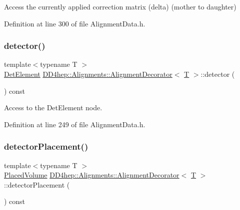 Access the currently applied correction matrix (delta) (mother to daughter) 



Definition at line 300 of file Alignment\+Data.\+h.

\hypertarget{class_d_d4hep_1_1_alignments_1_1_alignment_decorator_a4b987fb41e5abb24edc602be61050a06}{}\label{class_d_d4hep_1_1_alignments_1_1_alignment_decorator_a4b987fb41e5abb24edc602be61050a06} 
\subsubsection{\texorpdfstring{detector()}{detector()}}
{\footnotesize\ttfamily template$<$typename T $>$ \\
\hyperlink{class_d_d4hep_1_1_geometry_1_1_det_element}{Det\+Element} \hyperlink{class_d_d4hep_1_1_alignments_1_1_alignment_decorator}{D\+D4hep\+::\+Alignments\+::\+Alignment\+Decorator}$<$ \hyperlink{class_t}{T} $>$\+::detector (\begin{DoxyParamCaption}{ }\end{DoxyParamCaption}) const\hspace{0.3cm}{\ttfamily [inline]}}



Access to the Det\+Element node. 



Definition at line 249 of file Alignment\+Data.\+h.

\hypertarget{class_d_d4hep_1_1_alignments_1_1_alignment_decorator_a40ab3213777840bd21882ff07add2340}{}\label{class_d_d4hep_1_1_alignments_1_1_alignment_decorator_a40ab3213777840bd21882ff07add2340} 
\subsubsection{\texorpdfstring{detector\+Placement()}{detectorPlacement()}}
{\footnotesize\ttfamily template$<$typename T $>$ \\
\hyperlink{class_d_d4hep_1_1_alignments_1_1_alignment_decorator_a3dc9016a6686627ec2e6584aed9c8eeb}{Placed\+Volume} \hyperlink{class_d_d4hep_1_1_alignments_1_1_alignment_decorator}{D\+D4hep\+::\+Alignments\+::\+Alignment\+Decorator}$<$ \hyperlink{class_t}{T} $>$\+::detector\+Placement (\begin{DoxyParamCaption}{ }\end{DoxyParamCaption}) const\hspace{0.3cm}{\ttfamily [inline]}}



